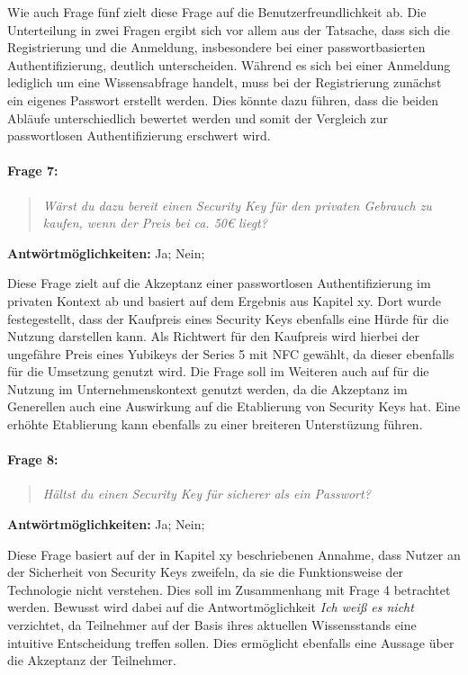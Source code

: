 Wie auch Frage fünf zielt diese Frage auf die Benutzerfreundlichkeit ab. Die Unterteilung in zwei Fragen ergibt sich vor allem aus der Tatsache, dass sich die Registrierung und die Anmeldung, insbesondere bei einer passwortbasierten Authentifizierung, deutlich unterscheiden. Während es sich bei einer Anmeldung lediglich um eine Wissensabfrage handelt, muss bei der Registrierung zunächst ein eigenes Passwort erstellt werden. Dies könnte dazu führen, dass die beiden Abläufe unterschiedlich bewertet werden und somit der Vergleich zur passwortlosen Authentifizierung erschwert wird.

\paragraph{Frage 7:}

\begin{quote}
    \textit{Wärst du dazu bereit einen Security Key für den privaten Gebrauch zu kaufen, wenn der Preis bei ca. 50€ liegt?}
\end{quote}

\textbf{Antwörtmöglichkeiten:} Ja; Nein;

Diese Frage zielt auf die Akzeptanz einer passwortlosen Authentifizierung im privaten Kontext ab und basiert auf dem Ergebnis aus Kapitel xy. Dort wurde festegestellt, dass der Kaufpreis eines Security Keys ebenfalls eine Hürde für die Nutzung darstellen kann. Als Richtwert für den Kaufpreis wird hierbei der ungefähre Preis eines Yubikeys der Series 5 mit NFC gewählt, da dieser ebenfalls für die Umsetzung genutzt wird. Die Frage soll im Weiteren auch auf für die Nutzung im Unternehmenskontext genutzt werden, da die Akzeptanz im Generellen auch eine Auswirkung auf die Etablierung von Security Keys hat. Eine erhöhte Etablierung kann ebenfalls zu einer breiteren Unterstüzung führen.

\paragraph{Frage 8:}

\begin{quote}
    \textit{Hältst du einen Security Key für sicherer als ein Passwort?}
\end{quote}

\textbf{Antwörtmöglichkeiten:} Ja; Nein;

Diese Frage basiert auf der in Kapitel xy beschriebenen Annahme, dass Nutzer an der Sicherheit von Security Keys zweifeln, da sie die Funktionsweise der Technologie nicht verstehen. Dies soll im Zusammenhang mit Frage 4 betrachtet werden. Bewusst wird dabei auf die Antwortmöglichkeit \textit{Ich weiß es nicht} verzichtet, da Teilnehmer auf der Basis ihres aktuellen Wissensstands eine intuitive Entscheidung treffen sollen. Dies ermöglicht ebenfalls eine Aussage über die Akzeptanz der Teilnehmer. 

